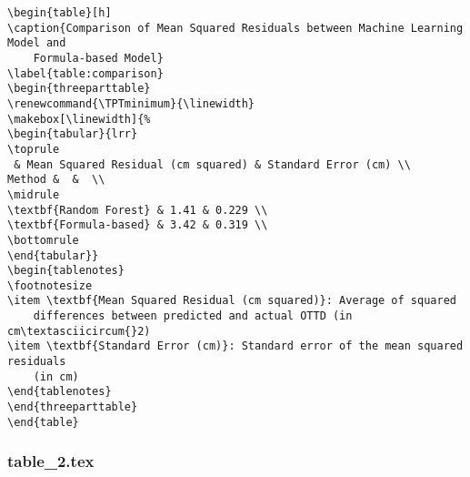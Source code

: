 \documentclass[11pt]{article}
\begin{document}
\begin{Verbatim}[tabsize=4]
\begin{table}[h]
\caption{Comparison of Mean Squared Residuals between Machine Learning Model and
	Formula-based Model}
\label{table:comparison}
\begin{threeparttable}
\renewcommand{\TPTminimum}{\linewidth}
\makebox[\linewidth]{%
\begin{tabular}{lrr}
\toprule
 & Mean Squared Residual (cm squared) & Standard Error (cm) \\
Method &  &  \\
\midrule
\textbf{Random Forest} & 1.41 & 0.229 \\
\textbf{Formula-based} & 3.42 & 0.319 \\
\bottomrule
\end{tabular}}
\begin{tablenotes}
\footnotesize
\item \textbf{Mean Squared Residual (cm squared)}: Average of squared
	differences between predicted and actual OTTD (in cm\textasciicircum{}2)
\item \textbf{Standard Error (cm)}: Standard error of the mean squared residuals
	(in cm)
\end{tablenotes}
\end{threeparttable}
\end{table}

\end{Verbatim}

\subsubsection*{table\_2.tex}
\end{document}
